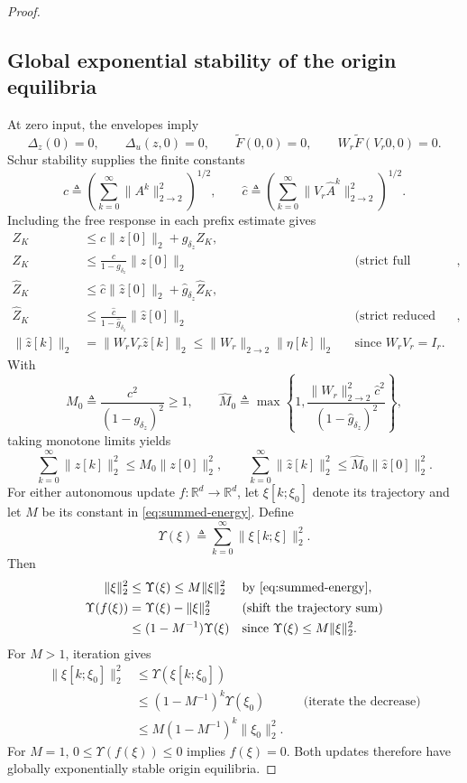 \documentclass{l4dc2027}
\newcommand{\R}{\mathbb R}
\newcommand{\eqdef}{\triangleq}
\begin{document}
\begin{proof}
\subsection{Global exponential stability of the origin equilibria}
At zero input, the envelopes imply
\[
 \Delta_z(0)=0,\qquad\Delta_u(z,0)=0,\qquad
 \widetilde F(0,0)=0,\qquad W_r\widetilde F(V_r0,0)=0.
\]
Schur stability supplies the finite constants
\[
 c\eqdef\left(\sum_{k=0}^\infty\|A^k\|_{2\to2}^2\right)^{1/2},\qquad
 \widehat c\eqdef
 \left(\sum_{k=0}^\infty\|V_r\widehat A^k\|_{2\to2}^2\right)^{1/2}.
\]
Including the free response in each prefix estimate gives
\[
 \begin{aligned}
 Z_K&\le c\|z[0]\|_2+g_{\delta_z}Z_K,\\
 Z_K&\le\frac{c}{1-g_{\delta_z}}\|z[0]\|_2
 &&\text{(strict full margin)},\\
 \widehat Z_K&\le\widehat c\|\widehat z[0]\|_2
                    +\widehat g_{\delta_z}\widehat Z_K,\\
 \widehat Z_K&\le\frac{\widehat c}{1-\widehat g_{\delta_z}}
                         \|\widehat z[0]\|_2
 &&\text{(strict reduced margin)},\\
 \|\widehat z[k]\|_2
 &=\|W_rV_r\widehat z[k]\|_2
 \le\|W_r\|_{2\to2}\|\eta[k]\|_2
 &&\text{since }W_rV_r=I_r.
 \end{aligned}
\]
With
\[
 M_0\eqdef\frac{c^2}{(1-g_{\delta_z})^2}\ge1,\qquad
 \widehat M_0\eqdef\max\left\{1,
 \frac{\|W_r\|_{2\to2}^2\widehat c^2}
      {(1-\widehat g_{\delta_z})^2}\right\},
\]
taking monotone limits yields
\begin{equation}\label{eq:summed-energy}
 \sum_{k=0}^\infty\|z[k]\|_2^2\le M_0\|z[0]\|_2^2,
 \qquad
 \sum_{k=0}^\infty\|\widehat z[k]\|_2^2
 \le\widehat M_0\|\widehat z[0]\|_2^2.
\end{equation}
For either autonomous update \mbox{$f:\R^d\to\R^d$}, let \mbox{$\xi[k;\xi_0]$} denote its trajectory and let \mbox{$M$} be its constant in \eqref{eq:summed-energy}.
Define
\[
 \Upsilon(\xi)\eqdef\sum_{k=0}^\infty\|\xi[k;\xi]\|_2^2.
\]
Then
\[
 \begin{aligned}
 \|\xi\|_2^2&\le\Upsilon(\xi)\le M\|\xi\|_2^2
 &&\text{by \eqref{eq:summed-energy}},\\
 \Upsilon(f(\xi))
 &=\Upsilon(\xi)-\|\xi\|_2^2
 &&\text{(shift the trajectory sum)}\\
 &\le(1-M^{-1})\Upsilon(\xi)
 &&\text{since }\Upsilon(\xi)\le M\|\xi\|_2^2.
 \end{aligned}
\]
For \mbox{$M>1$}, iteration gives
\[
 \begin{aligned}
 \|\xi[k;\xi_0]\|_2^2
 &\le\Upsilon(\xi[k;\xi_0])\\
 &\le(1-M^{-1})^k\Upsilon(\xi_0)
 &&\text{(iterate the decrease)}\\
 &\le M(1-M^{-1})^k\|\xi_0\|_2^2.
 \end{aligned}
\]
For \mbox{$M=1$}, \mbox{$0\le\Upsilon(f(\xi))\le0$} implies \mbox{$f(\xi)=0$}.
Both updates therefore have globally exponentially stable origin equilibria.
\end{proof}
\end{document}
